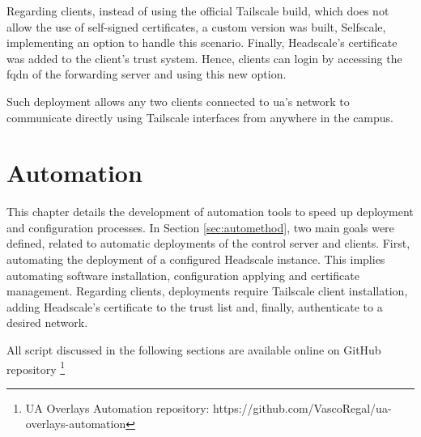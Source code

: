 \documentclass[11pt,twoside,a4paper]{report}
\begin{document}
Regarding clients, instead of using the official Tailscale build, which does not allow the use of self-signed certificates, a custom version was built, Selfscale, implementing an option to handle this scenario. Finally, Headscale's certificate was added to the client's trust system. Hence, clients can login by accessing the \ac{fqdn} of the forwarding server and using this new option.

Such deployment allows any two clients connected to \ac{ua}'s network to communicate directly using Tailscale interfaces from anywhere in the campus.

\chapter{Automation}
\label{ch:auto}

This chapter details the development of automation tools to speed up deployment and configuration processes. In Section \ref{sec:automethod}, two main goals were defined, related to automatic deployments of the control server and clients. First, automating the deployment of a configured Headscale instance. This implies automating software installation, configuration applying and certificate management. Regarding clients, deployments require Tailscale client installation, adding Headscale's certificate to the trust list and, finally, authenticate to a desired network.

All script discussed in the following sections are available online on GitHub repository \footnote{UA Overlays Automation repository: https://github.com/VascoRegal/ua-overlays-automation}

\end{document}

